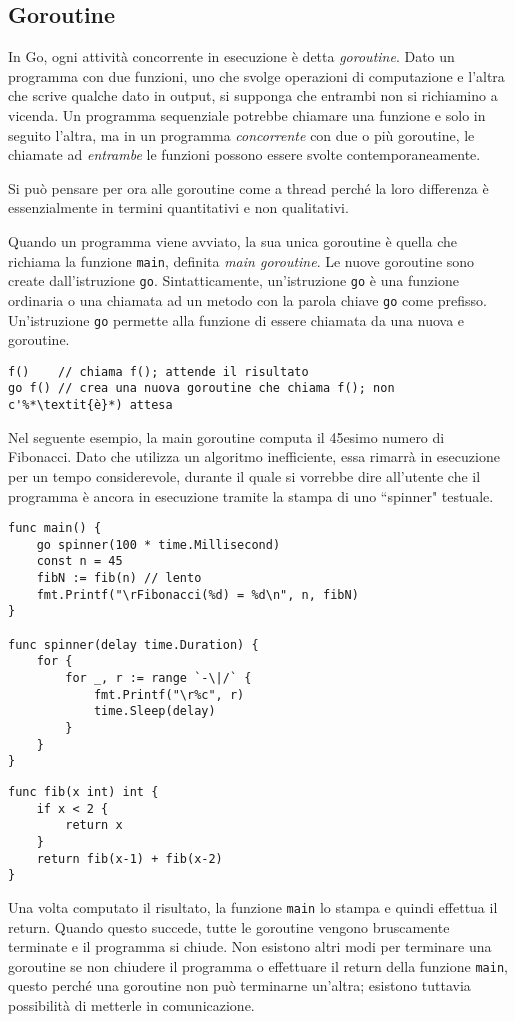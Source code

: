 \documentclass[../../thesis.tex]{subfiles}
\begin{document}
    \subsection{Goroutine}\label{subsec:goroutine}
    In Go, ogni attività concorrente in esecuzione è detta \textit{goroutine}.
    Dato un programma con due funzioni, uno che svolge operazioni di computazione e l'altra che scrive qualche dato in output, si supponga che entrambi non si richiamino a vicenda.
    Un programma sequenziale potrebbe chiamare una funzione e solo in seguito l'altra, ma in un programma \textit{concorrente} con due o più goroutine, le chiamate ad \textit{entrambe} le funzioni possono essere svolte contemporaneamente.
    \hfill \vspace{12pt}

    Si può pensare per ora alle goroutine come a thread perché la loro differenza è essenzialmente in termini quantitativi e non qualitativi.
    \hfill \vspace{12pt}

    Quando un programma viene avviato, la sua unica goroutine è quella che richiama la funzione \verb"main", definita \textit{main goroutine}.
    Le nuove goroutine sono create dall'istruzione \verb"go".
    Sintatticamente, un'istruzione \verb"go" è una funzione ordinaria o una chiamata ad un metodo con la parola chiave \verb"go" come prefisso.
    Un'istruzione \verb"go" permette alla funzione di essere chiamata da una nuova e goroutine.
    \begin{lstlisting}[frame = single, label = {lst:lstlisting7-1.1}]
f()    // chiama f(); attende il risultato
go f() // crea una nuova goroutine che chiama f(); non c'%*\textit{è}*) attesa
    \end{lstlisting}
    Nel seguente esempio, la main goroutine computa il 45esimo numero di Fibonacci.
    Dato che utilizza un algoritmo inefficiente, essa rimarrà in esecuzione per un tempo considerevole, durante il quale si vorrebbe dire all'utente che il programma è ancora in esecuzione tramite la stampa di uno ``spinner" testuale.
    \begin{lstlisting}[frame = single, label = {lst:lstlisting7-1.2}]
func main() {
    go spinner(100 * time.Millisecond)
    const n = 45
    fibN := fib(n) // lento 
    fmt.Printf("\rFibonacci(%d) = %d\n", n, fibN)
}

func spinner(delay time.Duration) {
    for {
        for _, r := range `-\|/` {
            fmt.Printf("\r%c", r)
            time.Sleep(delay)
        }
    }
}
    \end{lstlisting}
    \clearpage
    \newpage
    \begin{lstlisting}[frame = single, label = {lst:lstlisting7-1.3}]
func fib(x int) int {
    if x < 2 {
        return x
    }
    return fib(x-1) + fib(x-2)
}
    \end{lstlisting}
    Una volta computato il risultato, la funzione \verb"main" lo stampa e quindi effettua il return.
    Quando questo succede, tutte le goroutine vengono bruscamente terminate e il programma si chiude.
    Non esistono altri modi per terminare una goroutine se non chiudere il programma o effettuare il return della funzione \verb"main", questo perché una goroutine non può terminarne un'altra;
    esistono tuttavia possibilità di metterle in comunicazione.
\end{document}
